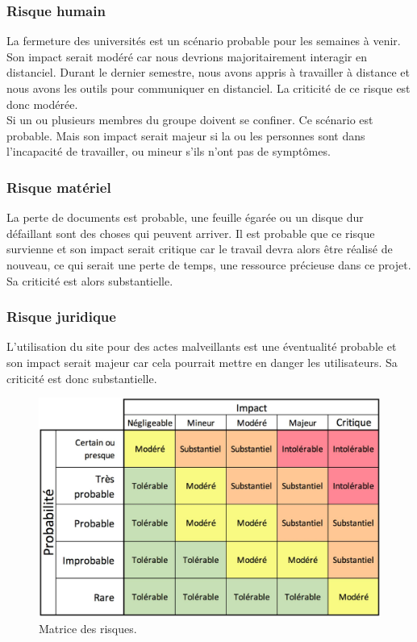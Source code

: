 \documentclass[a4paper,11pt]{article}
\begin{document}
\subsubsection{Risque humain}

La fermeture des universités est un scénario probable pour les semaines à venir. Son impact serait
modéré car nous devrions majoritairement interagir en distanciel. Durant le dernier semestre, nous
avons appris à travailler à distance et nous avons les outils pour communiquer en distanciel. La criticité
de ce risque est donc modérée.\\

Si un ou plusieurs membres du groupe doivent se confiner. Ce scénario est probable. Mais son impact
serait majeur si la ou les personnes sont dans l’incapacité de travailler, ou mineur s’ils n’ont pas de
symptômes.\\

\subsubsection{Risque matériel}

La perte de documents est probable, une feuille égarée ou un disque dur défaillant sont des choses
qui peuvent arriver. Il est probable que ce risque survienne et son impact serait critique car le travail
devra alors être réalisé de nouveau, ce qui serait une perte de temps, une ressource précieuse dans
ce projet. Sa criticité est alors substantielle.\\

\subsubsection{Risque juridique}

L’utilisation du site pour des actes malveillants est une éventualité probable et son impact serait
majeur car cela pourrait mettre en danger les utilisateurs. Sa criticité est donc substantielle.\\

\begin{figure}[H]
  \includegraphics[width=\linewidth]{images/matrice-criticite.png}
  \caption{Matrice des risques.}
  \label{fig:matrice-risques}
\end{figure}
\end{document}
